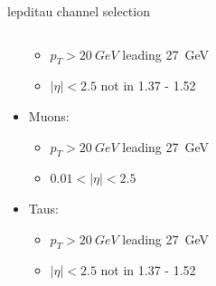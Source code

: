 \begin{frame}{\tHq lepditau channel selection}
\begin{columns}
\begin{column}{0.7\textwidth}
\begin{itemize}
\begin{itemize}
          \item $p_T>\SI{20}{GeV}$ leading \SI{27}{GeV}
          \item $|\eta|<2.5$ not in 1.37 - 1.52
        \end{itemize}
        \item Muons:
        \vspace*{-0.02\textwidth}
        \begin{itemize}
          \item $p_T>\SI{20}{GeV}$ leading \SI{27}{GeV}
          \item $0.01<|\eta|<2.5$
        \end{itemize}
        \item Taus:
        \vspace*{-0.02\textwidth}
        \begin{itemize}
          \item $p_T>\SI{20}{GeV}$ leading \SI{27}{GeV}
          \item $|\eta|<2.5$ not in 1.37 - 1.52
        \end{itemize}
      \end{itemize}
    \end{column}
  \end{columns}
\end{frame}
  
